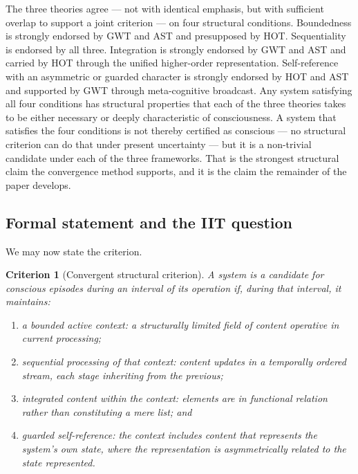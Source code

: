 \documentclass[11pt]{article}
\theoremstyle{foundation}
\newtheorem{criterion}{Criterion}
\begin{document}
The three theories agree --- not with identical emphasis, but with sufficient overlap to support a joint criterion --- on four structural conditions. Boundedness is strongly endorsed by GWT and AST and presupposed by HOT. Sequentiality is endorsed by all three. Integration is strongly endorsed by GWT and AST and carried by HOT through the unified higher-order representation. Self-reference with an asymmetric or guarded character is strongly endorsed by HOT and AST and supported by GWT through meta-cognitive broadcast. Any system satisfying all four conditions has structural properties that each of the three theories takes to be either necessary or deeply characteristic of consciousness. A system that satisfies the four conditions is not thereby certified as conscious --- no structural criterion can do that under present uncertainty --- but it is a non-trivial candidate under each of the three frameworks. That is the strongest structural claim the convergence method supports, and it is the claim the remainder of the paper develops.

\subsection{Formal statement and the IIT question}

We may now state the criterion.

\begin{criterion}[Convergent structural criterion]
A system is a \emph{candidate for conscious episodes} during an interval of its operation if, during that interval, it maintains:
\begin{enumerate}
    \item a \emph{bounded} active context: a structurally limited field of content operative in current processing;
    \item \emph{sequential} processing of that context: content updates in a temporally ordered stream, each stage inheriting from the previous;
    \item \emph{integrated} content within the context: elements are in functional relation rather than constituting a mere list; and
    \item \emph{guarded self-reference}: the context includes content that represents the system's own state, where the representation is asymmetrically related to the state represented.
\end{enumerate}
\end{criterion}
\end{document}
